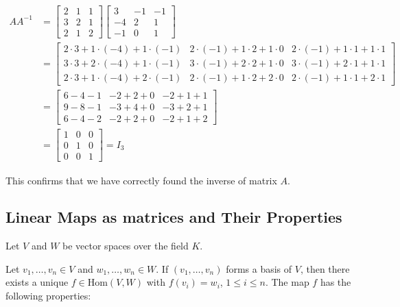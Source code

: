 \begin{align*}
    AA^{-1} &= 
    \begin{bmatrix}
    2 & 1 & 1 \\
    3 & 2 & 1 \\
    2 & 1 & 2
    \end{bmatrix}
    \begin{bmatrix}
    3 & -1 & -1 \\
    -4 & 2 & 1 \\
    -1 & 0 & 1
    \end{bmatrix} \\
    &= 
    \begin{bmatrix}
    2 \cdot 3 + 1 \cdot (-4) + 1 \cdot (-1) & 2 \cdot (-1) + 1 \cdot 2 + 1 \cdot 0 & 2 \cdot (-1) + 1 \cdot 1 + 1 \cdot 1 \\
    3 \cdot 3 + 2 \cdot (-4) + 1 \cdot (-1) & 3 \cdot (-1) + 2 \cdot 2 + 1 \cdot 0 & 3 \cdot (-1) + 2 \cdot 1 + 1 \cdot 1 \\
    2 \cdot 3 + 1 \cdot (-4) + 2 \cdot (-1) & 2 \cdot (-1) + 1 \cdot 2 + 2 \cdot 0 & 2 \cdot (-1) + 1 \cdot 1 + 2 \cdot 1
    \end{bmatrix} \\
    &= 
    \begin{bmatrix}
    6 - 4 - 1 & -2 + 2 + 0 & -2 + 1 + 1 \\
    9 - 8 - 1 & -3 + 4 + 0 & -3 + 2 + 1 \\
    6 - 4 - 2 & -2 + 2 + 0 & -2 + 1 + 2
    \end{bmatrix} \\
    &= 
    \begin{bmatrix}
    1 & 0 & 0 \\
    0 & 1 & 0 \\
    0 & 0 & 1
    \end{bmatrix} = I_3
\end{align*}

This confirms that we have correctly found the inverse of matrix \(A\).

\subsection{Linear Maps as matrices and Their Properties}

Let \(V\) and \(W\) be vector spaces over the field \(K\).

Let \(v_1, \dots, v_n \in V\) and \(w_1, \dots, w_n \in W\). If \((v_1, \dots, v_n)\) 
forms a basis of \(V\), then there exists a unique \(f \in \text{Hom}(V, W)\) with 
\(f(v_i) = w_i\), \(1 \leq i \leq n\). The map \(f\) has the following properties:

